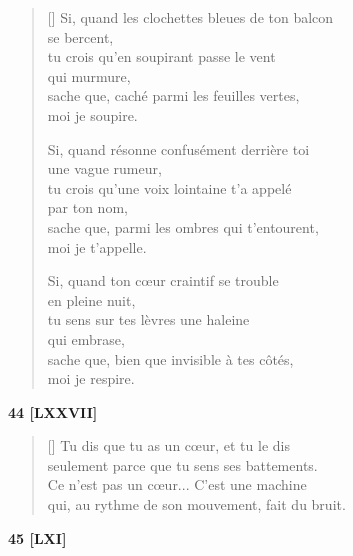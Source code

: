 \documentclass[a4paper,12pt]{book}
\begin{document}
\begin{verse}[\versewidth]
  Si, quand les clochettes bleues de ton balcon \\
  se bercent, \\
  tu crois qu'en soupirant passe le vent \\
  qui murmure, \\
  sache que, caché parmi les feuilles vertes, \\
  moi je soupire.

  Si, quand résonne confusément derrière toi \\
  une vague rumeur, \\
  tu crois qu'une voix lointaine t'a appelé \\
  par ton nom, \\
  sache que, parmi les ombres qui t'entourent, \\
  moi je t'appelle.

  Si, quand ton cœur craintif se trouble \\
  en pleine nuit, \\
  tu sens sur tes lèvres une haleine \\
  qui embrase, \\
  sache que, bien que invisible à tes côtés, \\
  moi je respire.
\end{verse}

\bigskip

\begin{center}
  \textbf{44 [LXXVII]}
   \end{center}

\settowidth{\versewidth}{qui, au rythme de son mouvement, fait du bruit.}

\begin{verse}[\versewidth]
  Tu dis que tu as un cœur, et tu le dis \\
  seulement parce que tu sens ses battements. \\
  Ce n'est pas un cœur... C'est une machine \\
  qui, au rythme de son mouvement, fait du bruit.
\end{verse}

\bigskip

\begin{center}
  \textbf{45 [LXI]}
\end{center}
\end{document}
